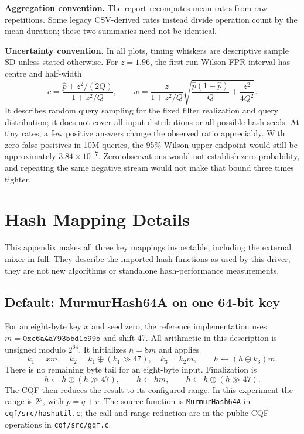 \textbf{Aggregation convention.} The report recomputes mean rates from raw repetitions. Some legacy CSV-derived rates instead divide operation count by the mean duration; these two summaries need not be identical.

\textbf{Uncertainty convention.} In all plots, timing whiskers are descriptive sample SD unless stated otherwise. For $z=1.96$, the first-run Wilson FPR interval has centre and half-width
\[
 c=\frac{\hat p+z^2/(2Q)}{1+z^2/Q},\qquad
 w=\frac{z}{1+z^2/Q}\sqrt{\frac{\hat p(1-\hat p)}{Q}+\frac{z^2}{4Q^2}}.
\]
It describes random query sampling for the fixed filter realization and query distribution; it does not cover all input distributions or all possible hash seeds.
At tiny rates, a few positive answers change the observed ratio appreciably. With zero false positives in 10M queries, the 95\% Wilson upper endpoint would still be approximately $3.84\times10^{-7}$. Zero observations would not establish zero probability, and repeating the same negative stream would not make that bound three times tighter.
\clearpage
\section{Hash Mapping Details}
\label{app:hash-details}
This appendix makes all three key mappings inspectable, including the external mixer in full. They describe the imported hash functions as used by this driver; they are not new algorithms or standalone hash-performance measurements.

\subsection{Default: MurmurHash64A on one 64-bit key}
For an eight-byte key $x$ and seed zero, the reference implementation uses $m=\mathtt{0xc6a4a7935bd1e995}$ and shift 47. All arithmetic in this description is unsigned modulo $2^{64}$. It initializes $h=8m$ and applies
\[
 k_1=xm,\quad k_2=k_1\oplus(k_1\gg47),\quad k_3=k_2m,
 \qquad h\leftarrow(h\oplus k_3)m.
\]
There is no remaining byte tail for an eight-byte input. Finalization is
\[
 h\leftarrow h\oplus(h\gg47),\qquad h\leftarrow hm,\qquad
 h\leftarrow h\oplus(h\gg47).
\]
The CQF then reduces the result to its configured range. In this experiment the range is $2^p$, with $p=q+r$. The source function is \texttt{MurmurHash64A} in \texttt{cqf/src/hashutil.c}; the call and range reduction are in the public CQF operations in \texttt{cqf/src/gqf.c}.


